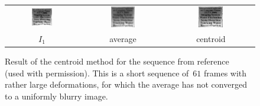 \documentclass{ipol}
\begin{document}
\begin{figure}[p]
	\begin{center}
		\begin{tabular}{ccc}
			\includegraphics[width=0.3\textwidth]{f/tian_first.png} &
			\includegraphics[width=0.3\textwidth]{f/tian_avg.png} &
			\includegraphics[width=0.3\textwidth]{f/tian_centroid.png} \\
			$I_1$ & average & centroid \\
		\end{tabular}
	\end{center}
	\caption{Result of the centroid method for the sequence from
	reference~\cite{tian2009seeing} (used with permission).
	This is a short sequence of~$61$ frames with rather large deformations,
	for which the average has not converged to a uniformly blurry image.
	}
	\label{fig:exptian}
\end{figure}
\end{document}
